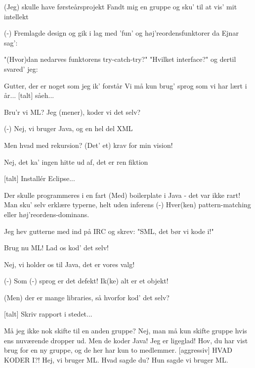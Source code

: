 \documentclass[a4paper,11pt]{article}
\begin{document}
\begin{song}
  (Jeg) skulle have førsteårsprojekt
  Fandt mig en gruppe og sku' til at vis' mit intellekt

  (-) Fremlagde design og gik i lag
  med 'fun' og høj'reordensfunktorer da Ejnar sag':

  "(Hvor)dan nedarves funktorens try-catch-try?"
  "Hvilket interface?"
  og dertil svared' jeg:

  Gutter, der er noget som jeg ik' forstår
  Vi må kun brug' sprog som vi har lært i år... [talt] såeh...

  Bru'r vi ML?
  Jeg (mener), koder vi det selv?

  (-) Nej, vi bruger Java, og en hel del XML

  Men hvad med rekursion?
  (Det' et) krav for min vision!

  Nej, det ka' ingen hitte ud af, det er ren fiktion

  [talt] Installér Eclipse...

  Der skulle programmeres i en fart
  (Med) boilerplate i Java - det var ikke rart!
  Man sku' selv erklære typerne, helt uden inferens
  (-) Hver(ken) pattern-matching eller høj'reordens-dominans.

  Jeg hev gutterne med ind på IRC
  og skrev: "SML, det bør vi kode i!"

  Brug nu ML!
  Lad os kod' det selv!

  Nej, vi holder os til Java, det er vores valg!

  (-) Som (-) sprog er det defekt!
  Ik(ke) alt er et objekt!

  (Men) der er mange libraries, så hvorfor kod' det selv?

  [talt] Skriv rapport i stedet...



   Må jeg ikke nok skifte til en anden gruppe?
   Nej, man må kun skifte gruppe hvis ens nuværende dropper ud.
   Men de koder Java!
   Jeg er ligeglad!
   Hov, du har vist brug for en ny gruppe, og de her har kun to medlemmer.
  [aggressiv] HVAD KODER I?!
   Hej, vi bruger ML.
   Hvad sagde du?
   Hun sagde vi bruger ML.


\end{song}
\end{document}
